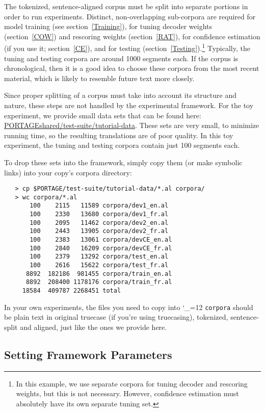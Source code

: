 \documentclass[11pt,letterpaper]{article}
\def\code{\begingroup\catcode`\_=12 \codex}
\newcommand{\codex}[1]{\texttt{#1}\endgroup}
\begin{document}
The tokenized, sentence-aligned corpus must be split into separate portions in
order to run experiments. Distinct, non-overlapping sub-corpora are required
for model training (see section~\ref{Training}), for tuning decoder weights
(section~\ref{COW}) and rescoring weights (section~\ref{RAT}), for confidence
estimation (if you use it; section~\ref{CE}), and for testing
(section~\ref{Testing}).\footnote{In this example, we use separate corpora for
tuning decoder and rescoring weights, but this is not necessary.  However,
confidence estimation must absolutely have its own separate tuning set.}
Typically, the tuning and testing corpora are around 1000 segments each.  If
the corpus is chronological, then it is a good idea to choose these corpora
from the most recent material, which is likely to resemble future text more
closely.

Since proper splitting of a corpus must take into account its structure
and nature, these steps are not handled by the experimental framework. For the
toy experiment, we provide small data sets that can be found here:
\url{PORTAGEshared/test-suite/tutorial-data}. These sets
are very small, to minimize running time, so the resulting translations are of
poor quality. In this toy experiment, the tuning and testing corpora contain
just 100 segments each.

To drop these sets into the framework, simply copy them (or make symbolic
links) into your copy's corpora directory:
\begin{small}
\begin{verbatim}
   > cp $PORTAGE/test-suite/tutorial-data/*.al corpora/
   > wc corpora/*.al
       100    2115   11589 corpora/dev1_en.al
       100    2330   13680 corpora/dev1_fr.al
       100    2095   11462 corpora/dev2_en.al
       100    2443   13905 corpora/dev2_fr.al
       100    2383   13061 corpora/devCE_en.al
       100    2840   16209 corpora/devCE_fr.al
       100    2379   13292 corpora/test_en.al
       100    2616   15622 corpora/test_fr.al
      8892  182186  981455 corpora/train_en.al
      8892  208400 1178176 corpora/train_fr.al
     18584  409787 2268451 total
\end{verbatim}
\end{small}

In your own experiments, the files you need to copy into \code{corpora}
should be plain text in original truecase (if you're using truecasing),
tokenized, sentence-split and aligned, just like the ones we provide here.

\subsection{Setting Framework Parameters} \label{FrameworkParams}
\end{document}

